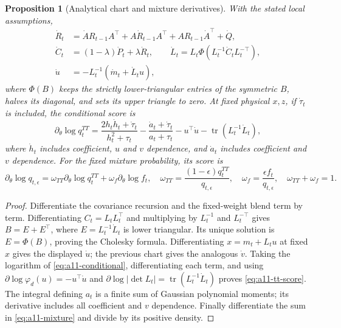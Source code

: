 \documentclass[11pt]{article}
\newtheorem{proposition}{Proposition}
\begin{document}
\begin{proposition}[Analytical chart and mixture derivatives]
\label{prop:a11-derivative}
With the stated local assumptions,
\begin{align}
 \dot R_t&=\dot A R_{t-1}A^\top+A\dot R_{t-1}A^\top
             +AR_{t-1}\dot A^\top+\dot Q,\nonumber\\
 \dot C_t&=(1-\lambda)\dot P_t+\lambda\dot R_t,\qquad
 \dot L_t=L_t\Phi(L_t^{-1}\dot C_t L_t^{-\top}),\nonumber\\
 \dot u&=-L_t^{-1}(\dot m_t+\dot L_tu),
 \label{eq:a11-chart-derivative}
\end{align}
where $\Phi(B)$ keeps the strictly lower-triangular entries of the symmetric
$B$, halves its diagonal, and sets its upper triangle to zero. At fixed
physical $x,z$, if $\dot\tau_t$ is included, the conditional score is
\begin{equation}
 \partial_\theta\log q_t^{TT}=
 \frac{2h_t\dot h_t+\dot\tau_t}{h_t^2+\tau_t}
 -\frac{\dot a_t+\dot\tau_t}{a_t+\tau_t}
 -u^\top\dot u-\operatorname{tr}(L_t^{-1}\dot L_t),
 \label{eq:a11-tt-score}
\end{equation}
where $\dot h_t$ includes coefficient, $u$ and $v$ dependence, and
$\dot a_t$ includes coefficient and $v$ dependence. For the fixed mixture
probability, its score is
\begin{equation}
 \partial_\theta\log q_{t,\epsilon}
 =\omega_{TT}\partial_\theta\log q_t^{TT}
  +\omega_f\partial_\theta\log f_t,
 \quad
 \omega_{TT}=\frac{(1-\epsilon)q_t^{TT}}{q_{t,\epsilon}},\quad
 \omega_f=\frac{\epsilon f_t}{q_{t,\epsilon}},\quad
 \omega_{TT}+\omega_f=1.
 \label{eq:a11-mixture-score}
\end{equation}
\end{proposition}
\begin{proof}
Differentiate the covariance recursion and the fixed-weight blend term by
term. Differentiating $C_t=L_tL_t^\top$ and multiplying by $L_t^{-1}$ and
$L_t^{-\top}$ gives $B=E+E^\top$, where $E=L_t^{-1}\dot L_t$ is lower
triangular. Its unique solution is $E=\Phi(B)$, proving the Cholesky formula.
Differentiating $x=m_t+L_tu$ at fixed $x$ gives the displayed $\dot u$;
the previous chart gives the analogous $\dot v$.
Taking the logarithm of \eqref{eq:a11-conditional}, differentiating each
term, and using $\partial\log\varphi_d(u)=-u^\top\dot u$ and
$\partial\log|\det L_t|=\operatorname{tr}(L_t^{-1}\dot L_t)$ proves
\eqref{eq:a11-tt-score}. The integral defining $a_t$ is a finite sum of
Gaussian polynomial moments; its derivative includes all coefficient and
$v$ dependence. Finally differentiate the sum in
\eqref{eq:a11-mixture} and divide by its positive density.
\end{proof}
\end{document}
